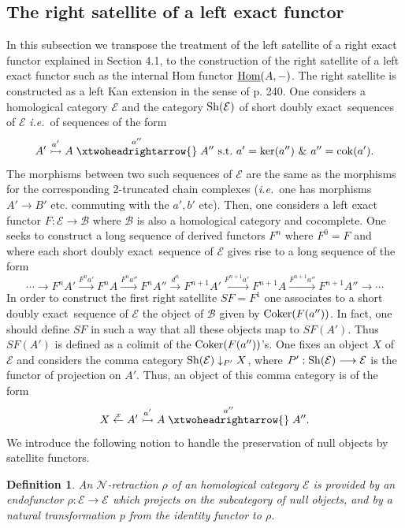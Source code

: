 \documentclass[12pt]{article}
\newtheorem{defn}[thm]{Definition}
\def\Hom{{\rm Hom}}
\def\Homi{{\underline{\rm Hom}}}
\def\sker{{\rm ker}}
\def\coker{{\rm Coker}}
\def\scoker{{\rm cok}}
\def\exxx{{doubly exact}~}
\def\cB{{\mathcal B}}
\def\cE{{\mathcal E}}
\def\cN{{\mathcal N}}
\newcommand{\ie}{{\it i.e.\/}\ }
\def\Hom {{\mbox{Hom}}}
\def\sequ{{\rm Sh}}
\begin{document}
\subsection{The right satellite of a left exact functor}\label{right satellite}
In this subsection we transpose the treatment of the left satellite of a right exact functor explained in \cite{gra1}  Section 4.1, to the construction of the right satellite of a left exact functor such as the internal $\Hom$ functor $\Homi(A,-)$. The right satellite is constructed as a left Kan extension in the sense of \cite{MacLane} p. 240. One considers a homological category $\cE$ and the category $\sequ(\cE)$ of short \exxx sequences of $\cE$ \ie of sequences of the form
$$
A'\stackrel{a'}{\rightarrowtail}A\stackrel{a''}{\xtwoheadrightarrow{}}A''~{\rm s.t.}~ a'= \sker(a'')\ \& \  a''= \scoker(a').
$$
 The morphisms between two such sequences of $\cE$ are the same as the morphisms 
 for the corresponding 2-truncated chain complexes (\ie one has morphisms $A'\to B'$ etc. commuting with the $a',b'$ etc). Then, one considers a left exact functor $F:\cE\longrightarrow \cB$ where $\cB$ is also a homological category and cocomplete. One seeks to construct a long sequence of derived functors $F^n$ where $F^0=F$ and where each short \exxx sequence of $\cE$ gives rise to a long sequence of the form
 $$
 \cdots \to F^nA'\stackrel{F^n a'}{\to}F^nA\stackrel{F^na''}{\to}F^nA''\stackrel{d^n}{\to} F^{n+1}A'\stackrel{F^{n+1} a'}{\to}F^{n+1}A\stackrel{F^{n+1}a''}{\to}F^{n+1}A''\to\cdots
 $$
 In order to construct the first right satellite $SF=F^1$ one associates to a short \exxx sequence of $\cE$ the object of $\cB$ given by $\coker(F(a''))$. In fact, one should define
 $SF$ in such a way that all these objects map to $SF(A')$. Thus  $SF(A')$ is defined as a colimit of the $\coker(F(a''))$'s. One fixes an object $X$ of $\cE$ and considers the comma  category $\sequ(\cE)\downarrow_{P'} X$, where  $P':\sequ(\cE)\longrightarrow \cE$ is the functor of projection on $A'$. Thus, an object of this comma category is of the form
 \begin{equation}\label{Comma category}
X\stackrel{x}{\leftarrow} A'\stackrel{a'}{\rightarrowtail}A\stackrel{a''}{\xtwoheadrightarrow{}}A''.
\end{equation}  
We introduce the following notion to handle the preservation of null objects by satellite functors.
\begin{defn}\label{N-retraction}  An  $\cN$-retraction $\rho$ of an homological category  $\cE$ is provided by an endofunctor $\rho:\cE\longrightarrow \cE$ which projects on the subcategory of null objects, and by a natural transformation $p$ from the identity functor to $\rho$.
\end{defn}
\end{document}
